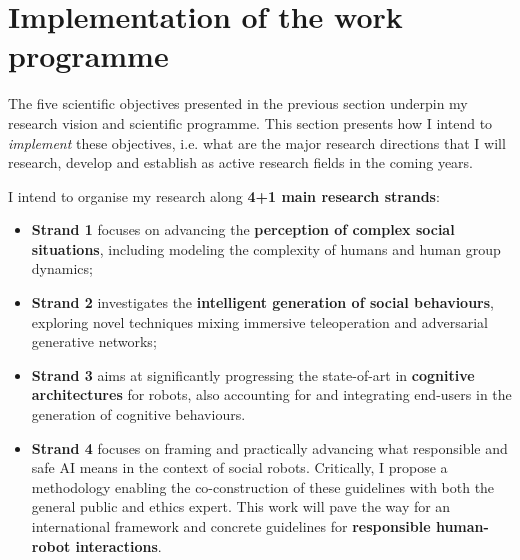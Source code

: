 



\vspace{3em}
\section{Implementation of the work programme}


The five scientific objectives presented in the previous section underpin my
research vision and scientific programme. This section presents how I intend
to \emph{implement} these objectives, i.e.  what are the major research
directions that I will research, develop and establish as active research fields
in the coming years.

\vspace{0.5em}
I intend to organise my research along \textbf{4+1 main research
strands}:

\vspace{0.5em}
\begin{itemize}
    \item {\bf Strand 1} focuses on advancing the \textbf{perception of complex social
        situations}, including modeling the complexity of humans and human group
        dynamics;
    \item {\bf Strand 2} investigates the \textbf{intelligent generation of social
        behaviours}, exploring novel techniques mixing immersive teleoperation
        and adversarial generative networks;
    \item {\bf Strand 3} aims at significantly progressing the state-of-art in
        \textbf{cognitive architectures} for robots, also accounting for and integrating
        end-users in the generation of cognitive behaviours.
    \item {\bf Strand 4} focuses on framing and practically advancing what
        responsible and safe AI means in the context of social robots.
        Critically, I propose a methodology enabling the co-construction of
        these guidelines with both the general public and ethics expert. This
        work will pave the way for an international framework and concrete
        guidelines for \textbf{responsible
        human-robot interactions}.
\end{itemize}
\vspace{0.5em}


